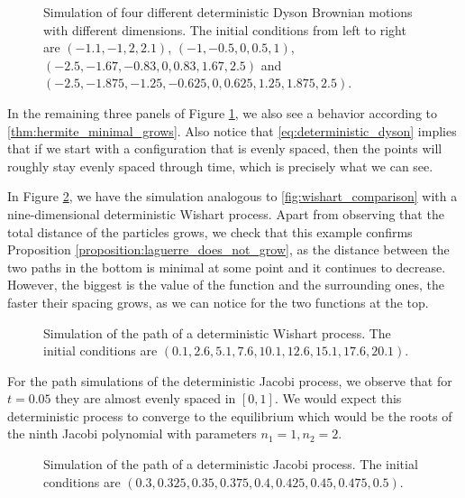 \begin{figure}[h!]
    
    \caption{Simulation of four different deterministic Dyson Brownian motions with different dimensions. The initial conditions from left to right are $(-1.1,-1,2,2.1)$, $(-1, -0.5, 0, 0.5, 1)$, $(-2.5,-1.67,-0.83,0,0.83,1.67,2.5)$ and $(-2.5,-1.875,-1.25,-0.625,0,0.625,1.25,1.875,2.5)$. \label{fig:four_det_dyson}}
\end{figure}

In the remaining three panels of Figure \ref{fig:four_det_dyson}, we also see a behavior according to \ref{thm:hermite_minimal_grows}. Also notice that \eqref{eq:deterministic_dyson} implies that if we start with a configuration that is evenly spaced, then the points will roughly stay evenly spaced through time, which is precisely what we can see. 

In Figure \ref{fig:det_wishart}, we have the simulation analogous to \ref{fig:wishart_comparison} with a nine-dimensional deterministic Wishart process. Apart from observing that the total distance of the particles grows, we check that this example confirms Proposition \ref{proposition:laguerre_does_not_grow}, as the distance between the two paths in the bottom is minimal at some point and it continues to decrease. However, the biggest is the value of the function and the surrounding ones, the faster their spacing grows, as we can notice for the two functions at the top.

\begin{figure}[h!]
    
    \caption{Simulation of the path of a deterministic Wishart process. The initial conditions are $(0.1,2.6,5.1,7.6,10.1,12.6,15.1,17.6,20.1)$.\label{fig:det_wishart}}
\end{figure}

For the path simulations of the deterministic Jacobi process, we observe that for $t=0.05$ they are almost evenly spaced in $[0,1]$. We would expect this deterministic process to converge to the equilibrium which would be the roots of the ninth Jacobi polynomial with parameters $n_1 = 1, n_2 =2$. 

\begin{figure}[h!]
    
    \caption{Simulation of the path of a deterministic Jacobi process. The initial conditions are $(0.3,0.325,0.35,0.375,0.4,0.425,0.45,0.475,0.5)$.\label{fig:det_jacobi}}
\end{figure}

\newpage